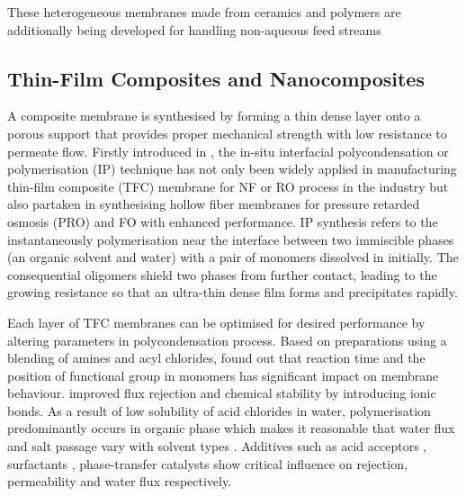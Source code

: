 \documentclass[a4paper,12pt]{report}
\begin{document}
These heterogeneous membranes made from ceramics and polymers are additionally being developed for handling non-aqueous feed streams \citep{kor04}

\subsection{Thin-Film Composites and Nanocomposites}

A composite membrane is synthesised by forming a thin dense layer onto a porous support that provides proper mechanical strength with low resistance to permeate flow. Firstly introduced in \cite{65mor}, the in-situ interfacial polycondensation or polymerisation (IP) technique has not only been widely applied in manufacturing thin-film composite (TFC) membrane for NF or RO process in the industry but also partaken in synthesising hollow fiber membranes for pressure retarded osmosis (PRO) \citep{13cho} and FO \citep{10wan} with enhanced performance. IP synthesis refers to the instantaneously polymerisation near the interface between two immiscible phases (an organic solvent and water) with a pair of monomers dissolved in initially. The consequential oligomers shield two phases from further contact, leading to the growing resistance so that an ultra-thin dense film forms and precipitates rapidly. 

Each layer of TFC membranes can be optimised for desired performance by altering parameters in polycondensation process. Based on preparations using a blending of amines and acyl chlorides, \citep{24kim} found out that reaction time and the position of functional group in monomers has significant impact on membrane behaviour. \citep{25nam} improved flux rejection and chemical stability by introducing ionic bonds. As a result of low solubility of acid chlorides in water, polymerisation predominantly occurs in organic phase which makes it reasonable that water flux and salt passage vary with solvent types \citep{26gho}. Additives such as acid acceptors \citep{28yan}, surfactants \citep{27man}, phase-transfer catalysts \citep{29kwa} show critical influence on rejection, permeability and water flux respectively.
\end{document}

